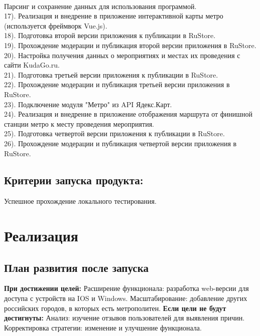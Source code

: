 \documentclass[a4paper,12pt]{extarticle}
\begin{document}
\\
Парсинг и сохранение данных для использования программой.
\\
17). Реализация и внедрение в приложение интерактивной карты метро (используется фреймворк Vue.js).
\\
18). Подготовка второй версии приложения к публикации в RuStore.
\\
19). Прохождение модерации и публикация второй версии приложения в RuStore.
\\
20). Настройка получения данных о мероприятиях и местах их проведения с сайти KudaGo.ru.
\\
21). Подготовка третьей версии приложения к публикации в RuStore.
\\
22). Прохождение модерации и публикация третьей версии приложения в RuStore.
\\
23). Подключение модуля "Метро" из API Ядекс.Карт.
\\
24). Реализация и внедрение в приложение отображения маршрута от финишной станции метро к месту проведения мероприятия.
\\
25). Подготовка четвертой версии приложения к публикации в RuStore.
\\
26). Прохождение модерации и публикация четвертой версии приложения в RuStore.


\subsection{Критерии запуска продукта:}
\noindent
Успешное прохождение локального тестирования.

\section{Реализация}
\subsection{План развития после запуска} 
\noindent
\textbf{При достижении целей:}
\newline
Расширение функционала: разработка web-версии для доступа с устройств на IOS и Windows.
\newline
Масштабирование: добавление других российских городов, в которых есть метрополитен.
\newline
\textbf{Если цели не будут достигнуты:}
\newline
Анализ: изучение отзывов пользователей для выявления причин.
\newline
Корректировка стратегии: изменение и улучшение функционала.
\end{document}
